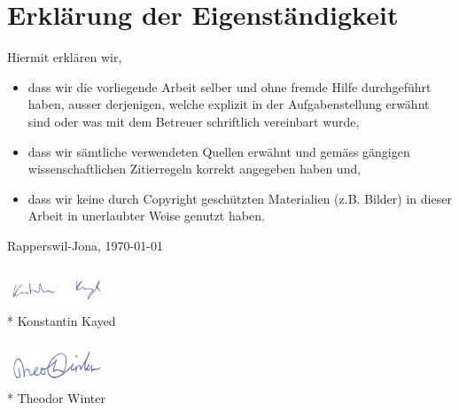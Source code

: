 \chapter*{Erklärung der Eigenständigkeit}

Hiermit erklären wir,

\begin{itemize}
\item dass wir die vorliegende Arbeit selber und ohne fremde Hilfe durchgeführt haben, ausser derjenigen, welche explizit in der Aufgabenstellung erwähnt sind oder was mit dem Betreuer schriftlich vereinbart wurde,

\item dass wir sämtliche verwendeten Quellen erwähnt und gemäss gängigen wissenschaftlichen Zitierregeln korrekt angegeben haben und,

\item dass wir keine durch Copyright geschützten Materialien (z.B. Bilder) in dieser Arbeit in unerlaubter Weise genutzt haben.
\end{itemize}


Rapperswil-Jona, \today
\\
\\
\includegraphics[width=3cm]{start/img/unterschrift_kkayed} \\*
Konstantin Kayed
\\
\\
\includegraphics[width=3cm]{start/img/unterschrift_twinter} \\*
Theodor Winter